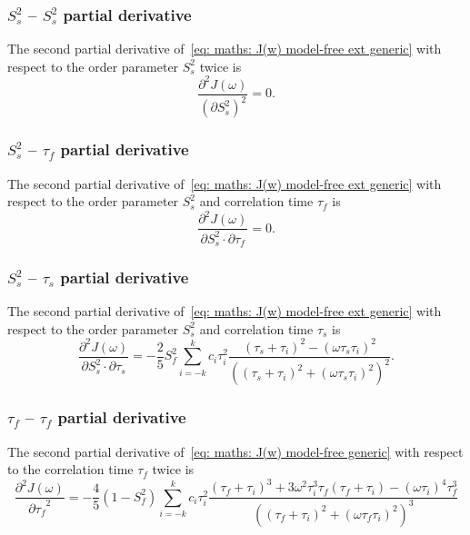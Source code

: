 \subsubsection{$S^2_s$ -- $S^2_s$ partial derivative}

The second partial derivative of~\eqref{eq: maths: J(w) model-free ext generic} with respect to the order parameter $S^2_s$ twice is
\begin{equation}
    \frac{\partial^2 J(\omega)}{(\partial S^2_s)^2} = 0.
\end{equation}



\subsubsection{$S^2_s$ -- $\tau_f$ partial derivative}

The second partial derivative of~\eqref{eq: maths: J(w) model-free ext generic} with respect to the order parameter $S^2_s$ and correlation time $\tau_f$ is
\begin{equation}
    \frac{\partial^2 J(\omega)}{\partial S^2_s \cdot \partial \tau_f} = 0.
\end{equation}



\subsubsection{$S^2_s$ -- $\tau_s$ partial derivative}

The second partial derivative of~\eqref{eq: maths: J(w) model-free ext generic} with respect to the order parameter $S^2_s$ and correlation time $\tau_s$ is
\begin{equation}
    \frac{\partial^2 J(\omega)}{\partial S^2_s \cdot \partial \tau_s} = -\frac{2}{5} S^2_f \sum_{i=-k}^k c_i \tau_i^2
        \frac{(\tau_s + \tau_i)^2 - (\omega \tau_s \tau_i)^2}{\left((\tau_s + \tau_i)^2 + (\omega \tau_s \tau_i)^2 \right)^2}.
\end{equation}



\subsubsection{$\tau_f$ -- $\tau_f$ partial derivative}

The second partial derivative of~\eqref{eq: maths: J(w) model-free generic} with respect to the correlation time $\tau_f$ twice is
\begin{equation}
    \frac{\partial^2 J(\omega)}{{\partial \tau_f}^2} = -\frac{4}{5} (1 - S^2_f) \sum_{i=-k}^k c_i \tau_i^2
        \frac{(\tau_f + \tau_i)^3  +  3 \omega^2 \tau_i^3 \tau_f (\tau_f + \tau_i)  -  (\omega \tau_i)^4 \tau_f^3}
            {\left((\tau_f + \tau_i)^2 + (\omega \tau_f \tau_i)^2 \right)^3}
\end{equation}



